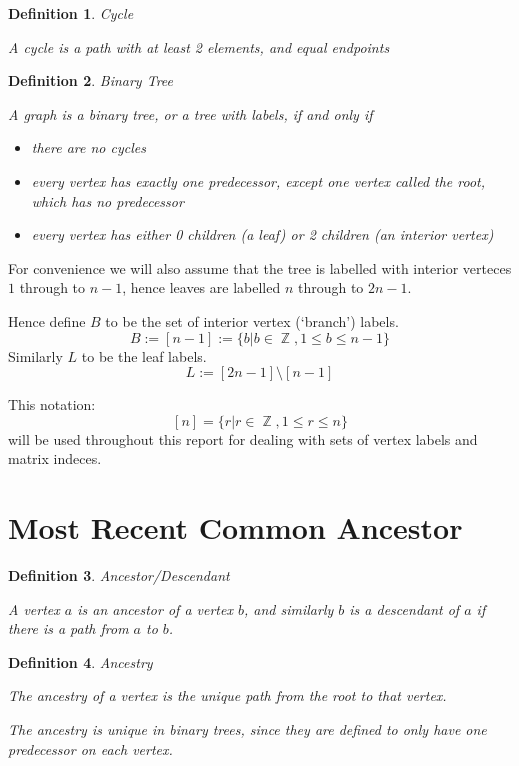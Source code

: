 \documentclass[10pt,a4paper]{report}
\DeclareMathOperator{\Z}{\mathds{Z}}
\newtheorem{definition}{Definition}
\begin{document}
\begin{definition} Cycle

	A cycle is a path with at least 2 elements, and equal endpoints
\end{definition}

\begin{definition} Binary Tree

	A graph is a binary tree, or a tree with labels, if and only if
	\begin{itemize}
		\item there are no cycles
		\item every vertex has exactly one predecessor, except one vertex called
			the root, which has no predecessor
		\item every vertex has either 0 children (a leaf) or 2 children
			(an interior vertex)
	\end{itemize}
\end{definition}

For convenience we will also assume that the tree is labelled with interior verteces $1$
through to $n-1$, hence leaves are labelled $n$ through to $2n-1$.

Hence define $B$ to be the set of interior vertex (`branch') labels.
\[B := [n-1] := \{b | b \in \Z, 1 \leq b \leq n-1\}\]
Similarly $L$ to be the leaf labels.
\[L := [2n-1] \setminus [n-1]\]

This notation: \[[n] = \{r|r\in\Z, 1 \leq r \leq n\}\] will be used throughout this report for dealing with sets of vertex labels and matrix indeces.

\section{Most Recent Common Ancestor}

\begin{definition} Ancestor/Descendant

	A vertex $a$ is an ancestor of a vertex $b$, and similarly $b$ is a
	descendant of $a$ if there is a path from $a$ to $b$.
\end{definition}

\begin{definition} Ancestry

	The ancestry of a vertex is the unique path from the root to that vertex.

	The ancestry is unique in binary trees, since they are defined to only have
	one predecessor on each vertex.
\end{definition}
\end{document}
